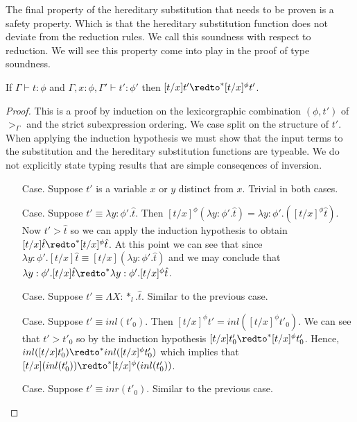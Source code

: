 The final property of the hereditary substitution that needs to be
proven is a safety property.  Which is that the hereditary substitution
function does not deviate from the reduction rules.  We call
this soundness with respect to reduction.  We will see this property
come into play in the proof of type soundness.
\begin{lemma}
  \label{lemma:soundness_reduction_ssfp}
  If $\Gamma \vdash t : \phi$ and $\Gamma, x:\phi, \Gamma' \vdash t':\phi'$ then
  $[t/x]t' \redto^* [t/x]^\phi t'$.
\end{lemma}
\begin{proof}
  This is a proof by induction on the lexicorgraphic combination
$(\phi, t')$ of $>_\Gamma$ and the strict subexpression ordering.
We case split on the structure of $t'$.  When applying
the induction hypothesis we must show that the input terms to the
substitution and the hereditary substitution functions are typeable.
We do not explicitly state typing results that are simple
conseqences of inversion.

\begin{itemize}
\item[Case.] Suppose $t'$ is a variable $x$ or $y$ distinct from $x$.  
  Trivial in both cases.
  
\item[Case.] Suppose $t' \equiv \lambda y:\phi'.\hat{t}$.  Then
  $[t/x]^\phi (\lambda y:\phi'.\hat{t}) = \lambda y:\phi'.([t/x]^\phi \hat{t})$. 
  Now $t' > \hat{t}$ so we can apply the induction hypothesis to obtain 
  $[t/x]\hat{t} \redto^* [t/x]^\phi \hat{t}$.  At this point we can see that since 
  $\lambda y:\phi'.[t/x]\hat{t} \equiv [t/x](\lambda y:\phi'.\hat{t})$ and we may
  conclude that $\lambda y:\phi'.[t/x]\hat{t} \redto^* \lambda y:\phi'.[t/x]^\phi \hat{t}$.
  
\item[Case.] Suppose $t' \equiv \Lambda X:*_l.\hat{t}$.  Similar to the previous case.
  
\item[Case.] Suppose $t' \equiv inl(t'_0)$.  Then $[t/x]^\phi t' = inl([t/x]^\phi t'_0)$.  We can
  see that $t' > t'_0$ so by the induction hypothesis $[t/x]t'_0 \redto^* [t/x]^\phi t'_0$.  Hence,
  $inl([t/x]t'_0) \redto^* inl([t/x]^\phi t'_0)$ which implies that 
  $[t/x](inl(t'_0)) \redto^* [t/x]^\phi (inl(t'_0))$.
  
\item[Case.] Suppose $t' \equiv inr(t'_0)$.  Similar to the previous case.
  

\end{itemize}
\end{proof}

